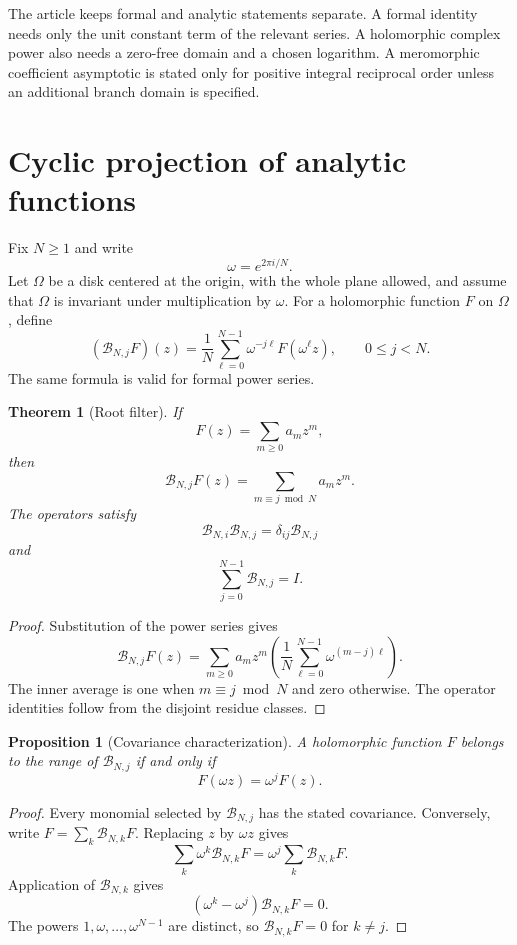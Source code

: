 \documentclass[11pt]{article}
\newtheorem{theorem}{Theorem}[section]
\newtheorem{proposition}[proposition]{Proposition}
\theoremstyle{definition}
\theoremstyle{remark}
\newcommand{\Bcal}{\mathcal B}
\begin{document}
The article keeps formal and analytic statements separate.  A formal identity needs only the unit constant term of the relevant series.  A holomorphic complex power also needs a zero-free domain and a chosen logarithm.  A meromorphic coefficient asymptotic is stated only for positive integral reciprocal order unless an additional branch domain is specified.

\section{Cyclic projection of analytic functions}\label{sec:cyclic_projection}

Fix $N\geq1$ and write
\[
\omega=e^{2\pi i/N}.
\]
Let $\Omega$ be a disk centered at the origin, with the whole plane allowed, and assume that $\Omega$ is invariant under multiplication by $\omega$.  For a holomorphic function $F$ on $\Omega$, define
\[
(\Bcal_{N,j}F)(z)
=
\frac1N\sum_{\ell=0}^{N-1}\omega^{-j\ell}F(\omega^\ell z),
\qquad 0\leq j<N.
\]
The same formula is valid for formal power series.

\begin{theorem}[Root filter]\label{thm:root_filter}
If
\[
F(z)=\sum_{m\geq0}a_mz^m,
\]
then
\[
\Bcal_{N,j}F(z)
=
\sum_{m\equiv j\bmod N}a_mz^m.
\]
The operators satisfy
\[
\Bcal_{N,i}\Bcal_{N,j}=\delta_{ij}\Bcal_{N,j}
\]
and
\[
\sum_{j=0}^{N-1}\Bcal_{N,j}=I.
\]
\end{theorem}

\begin{proof}
Substitution of the power series gives
\[
\Bcal_{N,j}F(z)
=
\sum_{m\geq0}a_mz^m
\left(
\frac1N\sum_{\ell=0}^{N-1}\omega^{(m-j)\ell}
\right).
\]
The inner average is one when $m\equiv j\bmod N$ and zero otherwise.  The operator identities follow from the disjoint residue classes.
\end{proof}

\begin{proposition}[Covariance characterization]\label{prop:covariance}
A holomorphic function $F$ belongs to the range of $\Bcal_{N,j}$ if and only if
\[
F(\omega z)=\omega^jF(z).
\]
\end{proposition}

\begin{proof}
Every monomial selected by $\Bcal_{N,j}$ has the stated covariance.  Conversely, write $F=\sum_k\Bcal_{N,k}F$.  Replacing $z$ by $\omega z$ gives
\[
\sum_k\omega^k\Bcal_{N,k}F
=
\omega^j\sum_k\Bcal_{N,k}F.
\]
Application of $\Bcal_{N,k}$ gives
\[
(\omega^k-\omega^j)\Bcal_{N,k}F=0.
\]
The powers $1,\omega,\ldots,\omega^{N-1}$ are distinct, so
$\Bcal_{N,k}F=0$ for $k\ne j$.
\end{proof}
\end{document}
